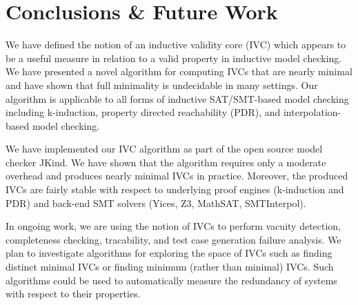 \section{Conclusions \& Future Work}
\label{sec:conc}

We have defined the notion of an inductive validity core (IVC) which
appears to be a useful measure in relation to a valid property in
inductive model checking. We have presented a novel algorithm for
computing IVCs that are nearly minimal and have shown that full
minimality is undecidable in many settings. Our algorithm is
applicable to all forms of inductive SAT/SMT-based model checking
including k-induction, property directed reachability (PDR), and
interpolation-based model checking.

We have implemented our IVC algorithm as part of the open source model
checker JKind. We have shown that the algorithm requires only a
moderate overhead and produces nearly minimal IVCs in practice.
Moreover, the produced IVCs are fairly stable with respect to
underlying proof engines (k-induction and PDR) and back-end SMT
solvers (Yices, Z3, MathSAT, SMTInterpol).

In ongoing work, we are using the notion of IVCs to perform vacuity
detection, completeness checking, tracability, and test case
generation failure analysis. We plan to investigate algorithms for
exploring the space of IVCs such as finding distinct minimal IVCs or
finding minimum (rather than minimal) IVCs. Such algorithms could be
used to automatically measure the redundancy of systems with respect
to their properties.


